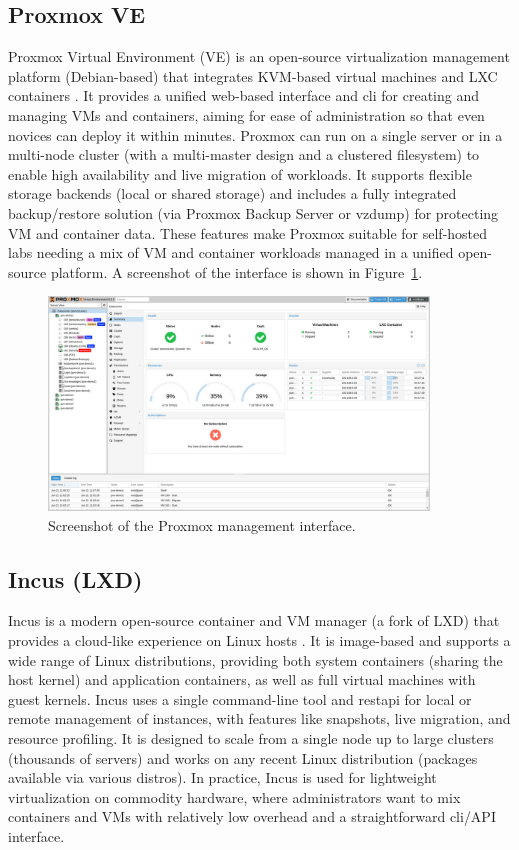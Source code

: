 \subsection*{Proxmox VE}

Proxmox Virtual Environment (VE) is an open-source virtualization management platform (Debian-based) that integrates KVM-based virtual machines and LXC containers \cite{proxmox-admin-guide-2025}. It provides a unified web-based interface and \gls{cli} for creating and managing VMs and containers, aiming for ease of administration so that even novices can deploy it within minutes. Proxmox can run on a single server or in a multi-node cluster (with a multi-master design and a clustered filesystem) to enable high availability and live migration of workloads. It supports flexible storage backends (local or shared storage) and includes a fully integrated backup/restore solution (via Proxmox Backup Server or vzdump) for protecting VM and container data. These features make Proxmox suitable for self-hosted labs needing a mix of VM and container workloads managed in a unified open-source platform. A screenshot of the interface is shown in Figure~\ref{fig:proxmox-ui}.

\begin{figure}[h!]
  \centering
  \includegraphics[width=0.9\textwidth]{imaxes/proxmox-ui.png}
  \caption{Screenshot of the Proxmox management interface.}
  \label{fig:proxmox-ui}
\end{figure}

\subsection*{Incus (LXD)}

Incus is a modern open-source container and VM manager (a fork of LXD) that provides a cloud-like experience on Linux hosts \cite{incus-linux-containers-2023}. It is image-based and supports a wide range of Linux distributions, providing both system containers (sharing the host kernel) and application containers, as well as full virtual machines with guest kernels. Incus uses a single command-line tool and \gls{restapi} for local or remote management of instances, with features like snapshots, live migration, and resource profiling. It is designed to scale from a single node up to large clusters (thousands of servers)  and works on any recent Linux distribution (packages available via various distros). In practice, Incus is used for lightweight virtualization on commodity hardware, where administrators want to mix containers and VMs with relatively low overhead and a straightforward \gls{cli}/API interface.

